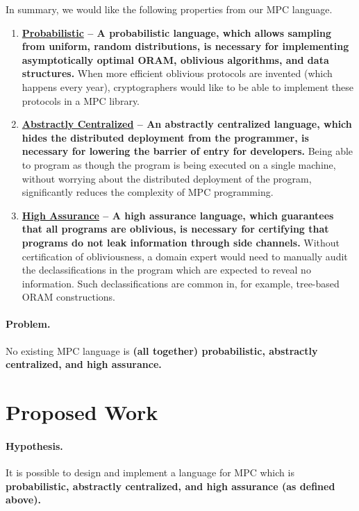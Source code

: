 \documentclass{report}
\begin{document}
In summary, we would like the following properties from our MPC language.

\begin{enumerate}
\item \label{itm:probabilistic} \textbf{\underline{Probabilistic} -- A probabilistic language, which allows sampling from uniform, random distributions, is necessary
  for implementing asymptotically optimal ORAM, oblivious algorithms, and data structures.}
  When more efficient oblivious protocols are invented (which happens every year), cryptographers would like to be able to
  implement these protocols in a MPC library.
\item \label{itm:centralized} \textbf{\underline{Abstractly Centralized} -- An abstractly centralized language, which hides the distributed deployment from the
  programmer, is necessary for lowering the barrier of entry for developers.}
  Being able to program as though the program is being executed on a single machine, without worrying about the distributed deployment
  of the program, significantly reduces the complexity of MPC programming.
\item \label{itm:assurance} \textbf{\underline{High Assurance} -- A high assurance language, which guarantees that all programs are oblivious, is necessary
  for certifying that programs do not leak information through side channels.} Without certification of obliviousness, a domain expert
  would need to manually audit the declassifications in the program which are expected to reveal no information. Such declassifications
  are common in, for example, tree-based ORAM constructions.
\end{enumerate}

\paragraph{Problem.} No existing MPC language is \textbf{(all together) probabilistic, abstractly centralized, and high assurance.}

\section{Proposed Work}
\label{sec:intro-proposal}

\paragraph{Hypothesis.} It is possible to design and implement a language for MPC which is \textbf{probabilistic, abstractly centralized,
  and high assurance (as defined above).}
\end{document}
